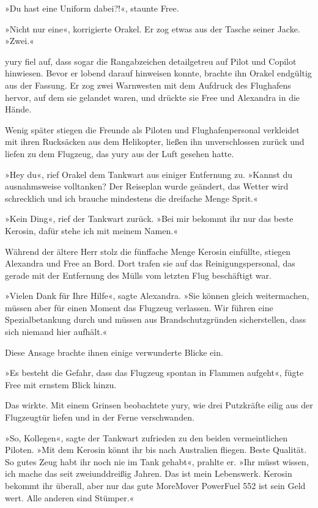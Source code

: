 »Du hast eine Uniform dabei?!«, staunte Free.

»Nicht nur eine«, korrigierte Orakel. Er zog etwas aus der Tasche seiner Jacke. »Zwei.«

yury fiel auf, dass sogar die Rangabzeichen detailgetreu auf Pilot und Copilot hinwiesen. Bevor er lobend darauf hinweisen konnte, brachte ihn Orakel endgültig aus der Fassung. Er zog zwei Warnwesten mit dem Aufdruck des Flughafens hervor, auf dem sie gelandet waren, und drückte sie Free und Alexandra in die Hände.

Wenig später stiegen die Freunde als Piloten und Flughafenpersonal verkleidet mit ihren Rucksäcken aus dem Helikopter, ließen ihn unverschlossen zurück und liefen zu dem Flugzeug, das yury aus der Luft gesehen hatte.

»Hey du«, rief Orakel dem Tankwart aus einiger Entfernung zu. »Kannst du ausnahmsweise volltanken? Der Reiseplan wurde geändert, das Wetter wird schrecklich und ich brauche mindestens die dreifache Menge Sprit.«

»Kein Ding«, rief der Tankwart zurück. »Bei mir bekommt ihr nur das beste Kerosin, dafür stehe ich mit meinem Namen.«

Während der ältere Herr stolz die fünffache Menge Kerosin einfüllte, stiegen Alexandra und Free an Bord. Dort trafen sie auf das Reinigungspersonal, das gerade mit der Entfernung des Mülls vom letzten Flug beschäftigt war.

»Vielen Dank für Ihre Hilfe«, sagte Alexandra. »Sie können gleich weitermachen, müssen aber für einen Moment das Flugzeug verlassen. Wir führen eine Spezialbetankung durch und müssen aus Brandschutzgründen sicherstellen, dass sich niemand hier aufhält.«

Diese Ansage brachte ihnen einige verwunderte Blicke ein.

»Es besteht die Gefahr, dass das Flugzeug spontan in Flammen aufgeht«, fügte Free mit ernstem Blick hinzu.

Das wirkte. Mit einem Grinsen beobachtete yury, wie drei Putzkräfte eilig aus der Flugzeugtür liefen und in der Ferne verschwanden.

»So, Kollegen«, sagte der Tankwart zufrieden zu den beiden vermeintlichen Piloten. »Mit dem Kerosin könnt ihr bis nach Australien fliegen. Beste Qualität. So gutes Zeug habt ihr noch nie im Tank gehabt«, prahlte er. »Ihr müsst wissen, ich mache das seit zweiunddreißig Jahren. Das ist mein Lebenswerk. Kerosin bekommt ihr überall, aber nur das gute MoreMover PowerFuel 552 ist sein Geld wert. Alle anderen sind Stümper.«

